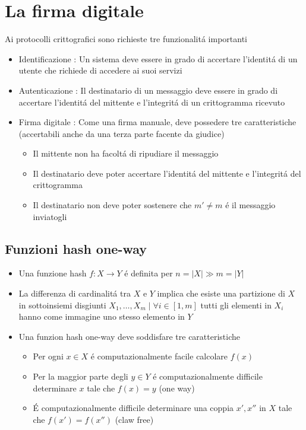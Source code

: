 \chapter{La firma digitale}

Ai protocolli crittografici sono richieste tre funzionalit\'a importanti

\begin{itemize}
    \item Identificazione : Un sistema deve essere in grado di accertare l'identit\'a di un utente che richiede di accedere ai suoi servizi
    \item Autenticazione : Il destinatario di un messaggio deve essere in grado di accertare l'identit\'a del mittente e l'integrit\'a di un crittogramma ricevuto
    \item Firma digitale : Come una firma manuale, deve possedere tre caratteristiche (accertabili anche da una terza parte facente da giudice)
    \begin{itemize}
        \item Il mittente non ha facolt\'a di ripudiare il messaggio
        \item Il destinatario deve poter accertare l'identit\'a del mittente e l'integrit\'a del crittogramma
        \item Il destinatario non deve poter sostenere che $m' \not= m$ \'e il messaggio inviatogli
    \end{itemize}
\end{itemize}

\section{Funzioni hash one-way}

\begin{itemize}
    \item Una funzione hash $f : X \to Y$ \'e definita per $n = |X| \gg m = |Y|$
    \item La differenza di cardinalit\'a tra $X$ e $Y$ implica che esiste una partizione di $X$ in sottoinsiemi disgiunti $X_1,\dots,X_m \mid \forall i \in [1,m]$ tutti gli elementi in $X_i$ hanno come immagine uno stesso elemento in $Y$
    \item Una funzion hash one-way deve soddisfare tre caratteristiche
    \begin{itemize}
        \item Per ogni $x \in X$ \'e computazionalmente facile calcolare $f(x)$
        \item Per la maggior parte degli $y \in Y$ \'e computazionalmente difficile determinare $x$ tale che $f(x) = y$ (one way)
        \item \'E computazionalmente difficile determinare una coppia $x', x''$ in $X$ tale che $f(x') = f(x'')$ (claw free)
    \end{itemize}
\end{itemize}

